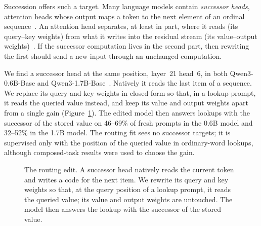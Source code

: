 \documentclass[11pt]{article}
\begin{document}
Succession offers such a target. Many language models contain \emph{successor heads}, attention heads whose output maps a token to the next element of an ordinal sequence~\cite{gould2023successor}. An attention head separates, at least in part, where it reads (its query--key weights) from what it writes into the residual stream (its value--output weights)~\cite{elhage2021framework}. If the successor computation lives in the second part, then rewriting the first should send a new input through an unchanged computation.

We find a successor head at the same position, layer~21 head~6, in both Qwen3-0.6B-Base and Qwen3-1.7B-Base~\cite{qwen3}. Natively it reads the last item of a sequence. We replace its query and key weights in closed form so that, in a lookup prompt, it reads the queried value instead, and keep its value and output weights apart from a single gain (Figure~\ref{fig:schematic}). The edited model then answers lookups with the successor of the stored value on 46--69\% of fresh prompts in the 0.6B model and 32--52\% in the 1.7B model. The routing fit sees no successor targets; it is supervised only with the position of the queried value in ordinary-word lookups, although composed-task results were used to choose the gain.

\begin{figure}[t]
\centering
{}
\caption{The routing edit. A successor head natively reads the current token and writes a code for the next item. We rewrite its query and key weights so that, at the query position of a lookup prompt, it reads the queried value; its value and output weights are untouched. The model then answers the lookup with the successor of the stored value.}
\label{fig:schematic}
\end{figure}
\end{document}
